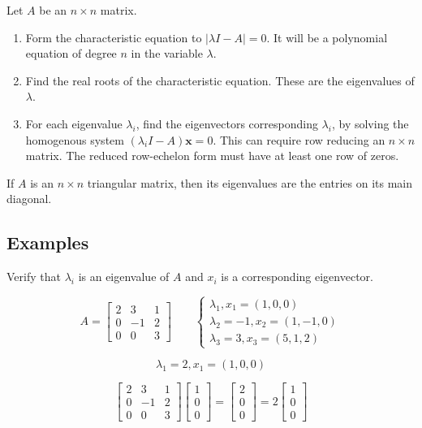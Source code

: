 \documentclass{report}
\begin{document}
\begin{tcolorbox}[title = Finding Eigenvalues and Eigenvectors]
		Let $A$ be an $n \times n$ matrix.
		
		\begin{enumerate}
				\item Form the characteristic equation to $| \lambda I - A | = 0$. It will be a polynomial equation of degree $n$ in the variable $\lambda$.
				\item Find the real roots of the characteristic equation. These are the eigenvalues of $\lambda$.
				\item For each eigenvalue $\lambda_i$, find the eigenvectors corresponding $\lambda_i$, by solving the homogenous system $( \lambda_i I - A) \bm{x} = 0$. This can require row reducing an $n \times n$ matrix. The reduced row-echelon form must have at least one row of zeros. 
		\end{enumerate}
\end{tcolorbox}

\begin{tcolorbox}[title = Eigenvalues of Triangular Matrix]
	If $A$ is an $n \times n$ triangular matrix, then its eigenvalues are the entries on its main diagonal. 
\end{tcolorbox}

\subsection{Examples}

\begin{tcolorbox}[colframe = lightred]
	Verify that $\lambda_i$ is an eigenvalue of $A$ and $x_i$ is a corresponding eigenvector.
	
	$$
	A = \begin{bmatrix} 2 &3 & 1 \\ 0 & -1 & 2 \\ 0 & 0 & 3 \end{bmatrix} \quad \quad \begin{cases} \lambda_1, x_1 = (1,0,0) \\ \lambda_2 = -1, x_2 = (1,-1,0) \\ \lambda_3 = 3, x_3 = (5,1,2) \end{cases}
	$$
\end{tcolorbox}

$$
\lambda_1 = 2, x_1 = (1,0,0)
$$

$$
\begin{bmatrix} 2 & 3 & 1 \\ 0 & -1 & 2 \\ 0 & 0 & 3 \end{bmatrix} \begin{bmatrix}1 \\ 0 \\ 0 \end{bmatrix} = \begin{bmatrix} 2 \\ 0 \\ 0 \end{bmatrix} = 2 \begin{bmatrix} 1 \\ 0 \\ 0 \end{bmatrix} 
$$
\end{document}
